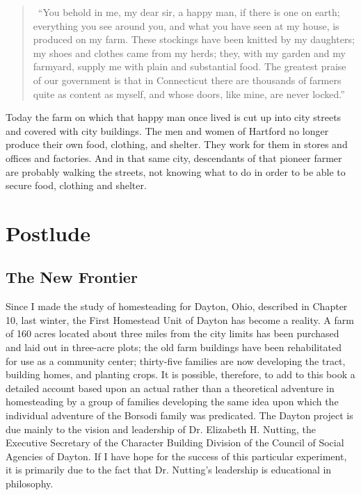 \documentclass{book}
\begin{document}
\begin{quotation}\
	“You behold in me, my dear sir, a happy man, if there is one on earth; everything you see around you, and what you have seen at my house, is produced on my farm. These stockings have been knitted by my daughters; my shoes and clothes came from my herds; they, with my garden and my farmyard, supply me with plain and substantial food. The greatest praise of our government is that in Connecticut there are thousands of farmers quite as content as myself, and whose doors, like mine, are never locked.”
\end{quotation}

Today the farm on which that happy man once lived is cut up into city streets and covered with city buildings. The men and women of Hartford no longer produce their own food, clothing, and shelter. They work for them in stores and offices and factories. And in that same city, descendants of that pioneer farmer are probably walking the streets, not knowing what to do in order to be able to secure food, clothing and shelter.

\chapter*{Postlude}
\label{chapter-11}
\section*{The New Frontier}
Since I made the study of homesteading for Dayton, Ohio, described in Chapter 10, last winter, the First Homestead Unit of Dayton has become a reality. A farm of 160 acres located about three miles from the city limits has been purchased and laid out in three-acre plots; the old farm buildings have been rehabilitated for use as a community center; thirty-five families are now developing the tract, building homes, and planting crops. It is possible, therefore, to add to this book a detailed account based upon an actual rather than a theoretical adventure in homesteading by a group of families developing the same idea upon which the individual adventure of the Borsodi family was predicated. The Dayton project is due mainly to the vision and leadership of Dr. Elizabeth H. Nutting, the Executive Secretary of the Character Building Division of the Council of Social Agencies of Dayton. If I have hope for the success of this particular experiment, it is primarily due to the fact that Dr. Nutting’s leadership is educational in philosophy.
\end{document}
